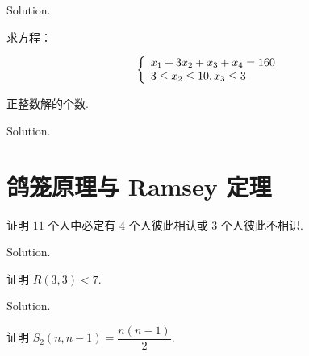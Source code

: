 \documentclass[cn, hazy, blue, normal, 12pt]{elegantnote}
\begin{document}
\begin{solution}[print=true]

    Solution.

\end{solution}

\begin{exercise}

    求方程：

    \begin{equation}
        \notag
        \left\{\begin{array}{l}
            x_{1}+3 x_{2}+x_{3}+x_{4}=160 \\
            3 \leq x_{2} \leq 10, x_{3} \leq 3
        \end{array}\right.
    \end{equation}

    正整数解的个数.

\end{exercise}

\begin{solution}[print=true]

    Solution.

\end{solution}


\section{鸽笼原理与 Ramsey 定理}

\begin{exercise}

    证明 $11$ 个人中必定有 $4$ 个人彼此相认或 $3$ 个人彼此不相识.

\end{exercise}

\begin{solution}[print=true]

    Solution.

\end{solution}

\begin{exercise}

    证明 $R(3, 3) < 7$.

\end{exercise}

\begin{solution}[print=true]

    Solution.

\end{solution}

\begin{exercise}

    证明 $S_{2}(n, n-1) = \dfrac{n(n-1)}{2}$.

\end{exercise}
\end{document}
